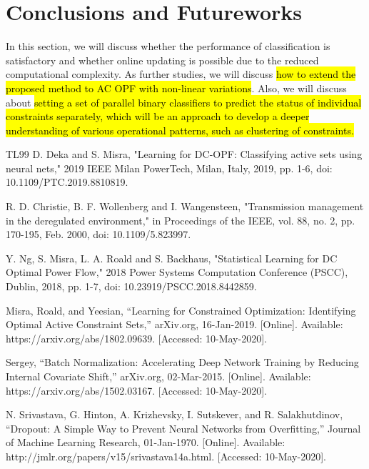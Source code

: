 \documentclass[11pt]{article}
\begin{document}
\section{Conclusions and Futureworks }\label{sec:conclusions}


In this section, we will discuss whether the performance of classification is satisfactory and whether online updating is possible due to the reduced computational complexity. As further studies, we will discuss \hl{how to extend the proposed method to AC OPF with non-linear variations}. Also, we will discuss about \hl{setting a set of parallel binary classifiers to predict the status of individual constraints separately, which will be an approach to develop a deeper understanding of various operational patterns, such as clustering of constraints.} 

\begin{thebibliography} {TL99}
{\sc D. Deka and S. Misra,} 
"Learning for DC-OPF: Classifying active sets using neural nets," 2019 IEEE Milan PowerTech, Milan, Italy, 2019, pp. 1-6, doi: 10.1109/PTC.2019.8810819.

\bibitem{}
{\sc R. D. Christie, B. F. Wollenberg and I. Wangensteen,} 
"Transmission management in the deregulated environment," in Proceedings of the IEEE, vol. 88, no. 2, pp. 170-195, Feb. 2000, doi: 10.1109/5.823997.

{\sc Y. Ng, S. Misra, L. A. Roald and S. Backhaus,} 
"Statistical Learning for DC Optimal Power Flow," 2018 Power Systems Computation Conference (PSCC), Dublin, 2018, pp. 1-7, doi: 10.23919/PSCC.2018.8442859.

{\sc Misra, Roald, and Yeesian,} 
“Learning for Constrained Optimization: Identifying Optimal Active Constraint Sets,” arXiv.org, 16-Jan-2019. [Online]. Available: https://arxiv.org/abs/1802.09639. [Accessed: 10-May-2020].



{\sc Sergey, }
“Batch Normalization: Accelerating Deep Network Training by Reducing Internal Covariate Shift,” arXiv.org, 02-Mar-2015. [Online]. Available: https://arxiv.org/abs/1502.03167. [Accessed: 10-May-2020].

{\sc N. Srivastava, G. Hinton, A. Krizhevsky, I. Sutskever, and R. Salakhutdinov,} 
“Dropout: A Simple Way to Prevent Neural Networks from Overfitting,” Journal of Machine Learning Research, 01-Jan-1970. [Online]. Available: http://jmlr.org/papers/v15/srivastava14a.html. [Accessed: 10-May-2020].


\end{thebibliography}
\end{document}
